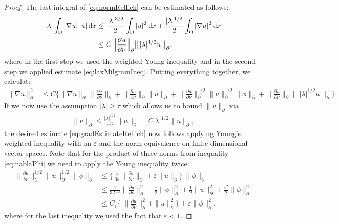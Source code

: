 \begin{proof}
  The last integral of \eqref{eq:normRellich} can be estimated as follows:
  \begin{align}
    |\lambda| \int_\Omega |\nabla u| \, |u| \, {\operatorname{d}\!{x}} 
    &\leq  \frac{|\lambda|^{3/2}}{2} \int_\Omega |u|^2 \, {\operatorname{d}\!{x}} + \frac{|\lambda|^{1/2}}{2 } \int_\Omega |\nabla u|^2 \, {\operatorname{d}\!{x}} \nonumber\\\label{eq:lambdaNablaU}
    &\leq C \, \Big\| \frac{\partial u}{\partial \nu} \Big\|_\partial \big\|\, |\lambda|^{1/2} u\,\big\|_\partial, 
  \end{align}
  where in the first step we used the weighted Young inequality and in the second step we applied estimate \eqref{eq:laxMilgramIneq}.
  Putting everything together, we calculate
  \begin{align*}
    \| \nabla u\|_\partial^2 
    &\leq C \bigg\{ \| \nabla u\|_\partial \, \Big\|\frac{\partial u}{\partial \nu} \Big\|_\partial 
    + \Big\| \frac{\partial u}{\partial \nu} \Big\|_\partial \|u\|_\partial 
    + \Big\| \frac{\partial u}{\partial \nu} \Big\|_\partial^{1/2} \|u\|_\partial^{1/2} \|\phi\|_\partial 
    + \Big\| \frac{\partial u}{\partial \nu} \Big\|_\partial \big\| \, |\lambda|^{1/2} u\, \big\|_\partial\bigg\}
  \end{align*}
  If we now use the assumption $|\lambda| \geq \tau$ which allows us to bound $\|u\|_\partial$ via
  \begin{align*}
    \|u\|_\partial \leq \frac{|\lambda|^{1/2}}{\tau^{1/2}} \|u\|_\partial = C |\lambda|^{1/2} \|u\|_{\partial},
  \end{align*}
  the desired estimate \eqref{eq:gradEstimateRellich} now follows applying Young's weighted inequality with an $\varepsilon$ and the norm equivalence on finite dimensional vector spaces. 
  Note that for the product of three norms from inequality \eqref{eq:nablaPhi} we need to apply the Young inequality twice:
  \begin{align*}
    \Big\| \frac{\partial u}{\partial \nu} \Big\|_\partial^{1/2} \|u\|_\partial^{1/2} \|\phi\|_\partial 
    &\leq \Big\{\, \frac{1}{4 \varepsilon} \Big\| \frac{\partial u}{\partial \nu} \Big\|_\partial 
  + \varepsilon \|u\|_\partial \Big\} \, \|\phi\|_\partial  \\[0.5em]
  &\leq \frac{1}{32\, \varepsilon^3} \Big\| \frac{\partial u}{\partial \nu} \Big\|_\partial^2 + \frac{\varepsilon}{2} \|\phi\|_\partial^2 + \frac{1}{2} \|u\|_\partial^2 + \frac{\varepsilon^2}{2} \|\phi\|_\partial^2 \\[0.5em]
  &\leq C_\varepsilon \Big\{ \; \Big\|\frac{\partial u}{\partial\nu} \Big\|_\partial^2 + \|u\|_\partial^2 \Big\} + \varepsilon \|\phi\|_\partial^2,
  \end{align*}
  where for the last inequality we used the fact that $\varepsilon < 1$.


\end{proof}
